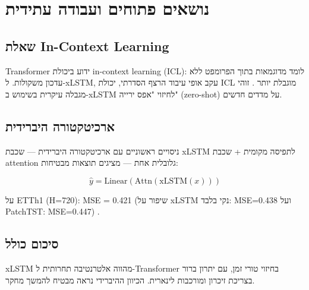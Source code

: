 
\chapter{נושאים פתוחים ועבודה עתידית}

\section{שאלת \textenglish{In-Context Learning}}

\textenglish{Transformer} ידוע ביכולת \textenglish{in-context learning} (\textenglish{ICL}): לומד מדוגמאות בתוך הפרומפט ללא עדכון משקולות. ל-\textenglish{xLSTM}, עקב אופי עיבוד הרצף הסדרתי, יכולת \textenglish{ICL} מוגבלת יותר \cite{brown2020language}. זוהי מגבלה עיקרית בשימוש ב-\textenglish{xLSTM} לחיזוי "אפס ירייה" (\textenglish{zero-shot}) על מדדים חדשים.

\section{ארכיטקטורה היברידית}

ניסויים ראשוניים עם ארכיטקטורה היברידית --- שכבת \textenglish{xLSTM} לתפיסה מקומית + שכבת \textenglish{attention} גלובלית אחת --- מציגים תוצאות מבטיחות:

\begin{equation}
\hat{y} = \text{Linear}\left(\text{Attn}\left(\text{xLSTM}(x)\right)\right)
\end{equation}

על \textenglish{ETTh1} (H=720): \textenglish{MSE = 0.421} (שיפור על \textenglish{xLSTM} נקי בלבד: \textenglish{MSE=0.438} ועל \textenglish{PatchTST}: \textenglish{MSE=0.447}) \cite{nie2022patchtst}.

\section{סיכום כולל}

\textenglish{xLSTM} מהווה אלטרנטיבה תחרותית ל-\textenglish{Transformer} בחיזוי טורי זמן, עם יתרון ברור בצריכת זיכרון ומורכבות לינארית. הכיוון ההיברידי נראה מבטיח להמשך מחקר.
